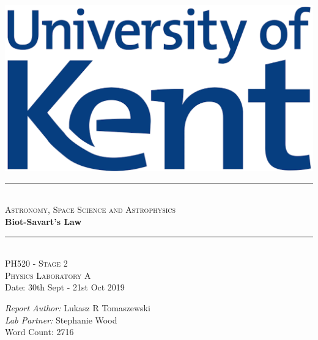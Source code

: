 \documentclass[12pt]{article}
\title{}
\begin{document}
\begin{titlepage}
\newcommand{\HRule}{\rule{\linewidth}{0.5mm}}
\begin{centering} 
\includegraphics[scale=0.6]{Images/Uni_of_Kent.png}\\[1cm]
\HRule \\[0.4cm]
\textsc{\large Astronomy, Space Science and Astrophysics}\\[0.5cm]
{ \Huge \bfseries Biot-Savart's Law}\\[0.4cm]
\HRule \\[1.0cm]
\textsc{\Large PH520 - Stage 2}\\[0.4cm] 
\textsc{\Large Physics Laboratory A}\\[0.4cm] 
{\large Date: 30th Sept - 21st Oct 2019}\\[0.4cm]
\begin{minipage}{0.625\textwidth}
\begin{center} \large
\emph{Report Author:} Lukasz R Tomaszewski \\[0.2cm]
\emph{Lab Partner:} Stephanie Wood \\ [0.5cm]
{\large Word Count: 2716}\\
\end{center}
\end{minipage}\\[2cm]
\vfill
\end{centering} 
\end{titlepage}
\end{document}
